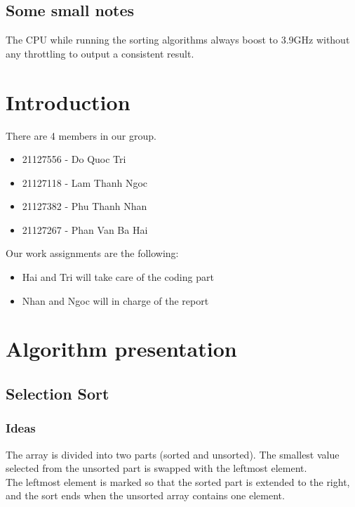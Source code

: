 \documentclass{article}
\newcommand\tab[1][0.5cm]{\hspace*{#1}}
\begin{document}
\subsection{Some small notes}
The CPU while running the sorting algorithms always boost to 3.9GHz without any throttling to output a consistent result.

\section{Introduction}
There are 4 members in our group.
\begin{itemize}
    \item 21127556 - Do Quoc Tri
    \item 21127118 - Lam Thanh Ngoc
    \item 21127382 - Phu Thanh Nhan
    \item 21127267 - Phan Van Ba Hai
\end{itemize}
Our work assignments are the following:
\begin{itemize}
    \item Hai and Tri will take care of the coding part
    \item Nhan and Ngoc will in charge of the report 
\end{itemize}

\pagebreak


\section{Algorithm presentation}


\subsection{Selection Sort}

\subsubsection{Ideas}

\tab The array is divided into two parts (sorted and unsorted). The smallest value selected from the unsorted part is swapped with the leftmost element.\\
\tab The leftmost element is marked so that the sorted part is extended to the right, and the sort ends when the unsorted array contains one element.
\end{document}
